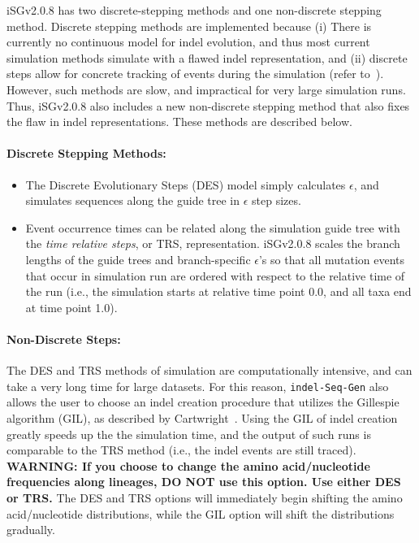 \documentclass[10pt]{article}
\newcommand{\version}{2.0.8 }
\newcommand{\iSGcurrentshort}{iSGv\version }
\begin{document}
 \iSGcurrentshort has two discrete-stepping methods and one non-discrete stepping method. Discrete stepping methods are implemented because (i) There is currently no continuous model for indel evolution, and thus most current simulation methods simulate with a flawed indel representation, and (ii) discrete steps allow for concrete tracking of events during the simulation (refer to~\cite{Strope09}). However, such methods are slow, and impractical for very large simulation runs. Thus, \iSGcurrentshort also includes a new non-discrete stepping method that also fixes the flaw in indel representations. These methods are described below.

 \paragraph{Discrete Stepping Methods:}
 \begin{itemize}
 \item The Discrete Evolutionary Steps (DES) model simply calculates $\epsilon$, and simulates sequences along the guide tree in $\epsilon$ step sizes.
 \item Event occurrence times can be related along the simulation guide tree with the \emph{time relative steps}, or TRS, representation. \iSGcurrentshort scales the branch lengths of the guide trees and branch-specific $\epsilon$'s so that all mutation events that occur in simulation run are ordered with respect to the relative time of the run (i.e., the simulation starts at relative time point 0.0, and all taxa end at time point 1.0).
 \end{itemize}

 \paragraph{Non-Discrete Steps:} The DES and TRS methods of simulation are computationally intensive, and can take a very long time for large datasets. For this reason, {\tt indel-Seq-Gen} also allows the user to choose an indel creation procedure that utilizes the Gillespie algorithm (GIL), as described by Cartwright~\cite{Cartwright05}. Using the GIL of indel creation greatly speeds up the the simulation time, and the output of such runs is comparable to the TRS method (i.e., the indel events are still traced). {\bf WARNING: If you choose to change the amino acid/nucleotide frequencies along lineages, DO NOT use this option. Use either DES or TRS.} The DES and TRS options will immediately begin shifting the amino acid/nucleotide distributions, while the GIL option will shift the distributions gradually.
\end{document}
